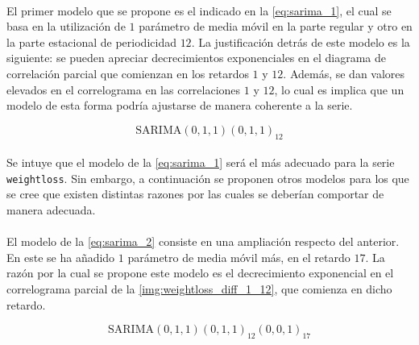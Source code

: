 \documentclass[a4paper, spanish]{article}
\begin{document}
      \paragraph{}
      El primer modelo que se propone es el indicado en la \autoref{eq:sarima_1}, el cual se basa en la utilización de $1$ parámetro de media móvil en la parte regular y otro en la parte estacional de periodicidad $12$. La justificación detrás de este modelo es la siguiente: se pueden apreciar decrecimientos exponenciales en el diagrama de correlación parcial que comienzan en los retardos $1$ y $12$. Además, se dan valores elevados en el correlograma en las correlaciones $1$ y $12$, lo cual es implica que un modelo de esta forma podría ajustarse de manera coherente a la serie.

      \begin{equation}
        \label{eq:sarima_1}
        \text{SARIMA}(0, 1, 1)(0, 1, 1)_{12}
      \end{equation}

      \paragraph{}
      Se intuye que el modelo de la \autoref{eq:sarima_1} será el más adecuado para la serie \texttt{weightloss}. Sin embargo, a continuación se proponen otros modelos para los que se cree que existen distintas razones por las cuales se deberían comportar de manera adecuada.

      \paragraph{}
      El modelo de la \autoref{eq:sarima_2} consiste en una ampliación respecto del anterior. En este se ha añadido $1$ parámetro de media móvil más, en el retardo $17$. La razón por la cual se propone este modelo es el decrecimiento exponencial en el correlograma parcial de la \autoref{img:weightloss_diff_1_12}, que comienza en dicho retardo.

      \begin{equation}
        \label{eq:sarima_2}
        \text{SARIMA}(0, 1, 1)(0, 1, 1)_{12}(0, 0, 1)_{17}
      \end{equation}
\end{document}
